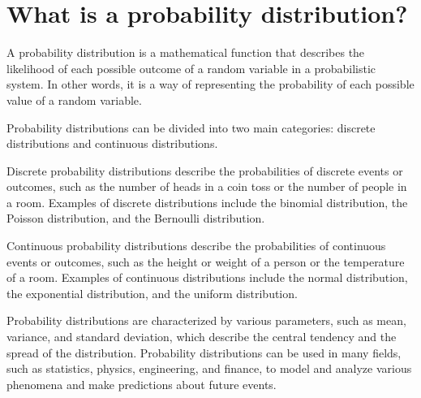 \section{What is a probability distribution?}
A probability distribution is a mathematical function that describes the likelihood of each possible outcome of a random variable in a probabilistic system. In other words, it is a way of representing the probability of each possible value of a random variable.

Probability distributions can be divided into two main categories: discrete distributions and continuous distributions.

Discrete probability distributions describe the probabilities of discrete events or outcomes, such as the number of heads in a coin toss or the number of people in a room. Examples of discrete distributions include the binomial distribution, the Poisson distribution, and the Bernoulli distribution.

Continuous probability distributions describe the probabilities of continuous events or outcomes, such as the height or weight of a person or the temperature of a room. Examples of continuous distributions include the normal distribution, the exponential distribution, and the uniform distribution.

Probability distributions are characterized by various parameters, such as mean, variance, and standard deviation, which describe the central tendency and the spread of the distribution. Probability distributions can be used in many fields, such as statistics, physics, engineering, and finance, to model and analyze various phenomena and make predictions about future events.

